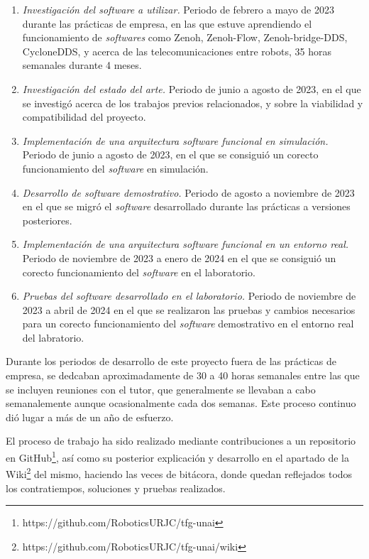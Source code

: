 
\begin{enumerate}
    \item{\textit{Investigación del software a utilizar.} Periodo de febrero a
        mayo de 2023 durante las prácticas de empresa, en las que estuve
        aprendiendo el funcionamiento de \textit{softwares} como Zenoh,
        Zenoh-Flow, Zenoh-bridge-DDS, CycloneDDS, y acerca de las
        telecomunicaciones entre robots, 35 horas semanales durante 4 meses.}
    \item{\textit{Investigación del estado del arte.} Periodo de junio a agosto
        de 2023, en el que se investigó acerca de los trabajos previos
        relacionados, y sobre la viabilidad y compatibilidad del proyecto.}
    \item{\textit{Implementación de una arquitectura software funcional en
        simulación.} Periodo de junio a agosto de 2023, en el que se consiguió
        un corecto funcionamiento del \textit{software} en simulación.}
    \item{\textit{Desarrollo de software demostrativo.} Periodo de agosto a
        noviembre de 2023 en el que se migró el \textit{software} desarrollado
        durante las prácticas a versiones posteriores.}
    \item{\textit{Implementación de una arquitectura software funcional en un
        entorno real.} Periodo de noviembre de 2023 a enero de 2024 en el que se
        consiguió un corecto funcionamiento del \textit{software} en el
        laboratorio.}
    \item{\textit{Pruebas del software desarrollado en el laboratorio.} Periodo
        de noviembre de 2023 a abril de 2024 en el que se realizaron las pruebas
        y cambios necesarios para un corecto funcionamiento del
        \textit{software} demostrativo en el entorno real del labratorio.}
\end{enumerate}

Durante los periodos de desarrollo de este proyecto fuera de las prácticas de
empresa, se dedcaban aproximadamente de 30 a 40 horas semanales entre las que se
incluyen reuniones con el tutor, que generalmente se llevaban a cabo
semanalemente aunque ocasionalmente cada dos semanas.
Este proceso continuo dió lugar a más de un año de esfuerzo.

El proceso de trabajo ha sido realizado mediante contribuciones a un repositorio
en GitHub\footnote{https://github.com/RoboticsURJC/tfg-unai}, así como su
posterior explicación y desarrollo en el apartado de la
Wiki\footnote{https://github.com/RoboticsURJC/tfg-unai/wiki} del mismo, haciendo
las veces de bitácora, donde quedan reflejados todos los contratiempos,
soluciones y pruebas realizados.

